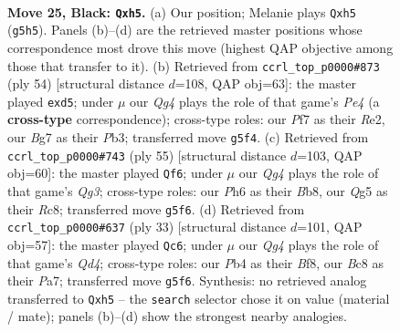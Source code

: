 \documentclass[11pt]{article}
\begin{document}
\clearpage

\begin{figure}[p]\centering
\begin{subfigure}{0.46\textwidth}\centering
\resizebox{\linewidth}{!}{%
\newchessgame
\chessboard[
  setfen={nrbr2k1/5pb1/p6p/2p1p1qP/1p2P2n/3P4/PPQ2PB1/RNB1NRK1 b - - 0 25},
  showmover=false,
  pgfstyle=straightmove, color=movearrow, markmove={g5-h5}
]}
\caption{}
\end{subfigure}\hfill
\begin{subfigure}{0.46\textwidth}\centering
\resizebox{\linewidth}{!}{%
\newchessgame
\chessboard[
  setfen={2r1rbk1/1q1n1ppb/1p5p/p1pp4/P3P2P/1PQN1BP1/1B2RP2/3R2K1 w - - 0 28},
  showmover=false,
  pgfstyle=straightmove, color=movearrow, markmove={e4-d5}
]}
\caption{}
\end{subfigure}
\\[4pt]
\begin{subfigure}{0.46\textwidth}\centering
\resizebox{\linewidth}{!}{%
\newchessgame
\chessboard[
  setfen={1br1brk1/pp4p1/1n2p1qp/4p3/4P1PP/P1NR1NBK/1PR1QP2/8 b - - 4 28},
  showmover=false,
  pgfstyle=straightmove, color=movearrow, markmove={g6-f6}
]}
\caption{}
\end{subfigure}\hfill
\begin{subfigure}{0.46\textwidth}\centering
\resizebox{\linewidth}{!}{%
\newchessgame
\chessboard[
  setfen={r3kb1r/pb1n1p2/4p2p/1p1q2p1/3P4/3QN2N/PPP2PPP/R1B2RK1 b kq - 5 17},
  showmover=false,
  pgfstyle=straightmove, color=movearrow, markmove={d5-c6}
]}
\caption{}
\end{subfigure}
\caption{\textbf{Move 25, Black: \texttt{Qxh5}.} (a) Our position; Melanie plays \texttt{Qxh5} (\texttt{g5h5}). Panels (b)--(d) are the retrieved master positions whose correspondence most drove this move (highest QAP objective among those that transfer to it). (b) Retrieved from \texttt{ccrl\_top\_p0000\#873} (ply 54) [structural distance $d$=108, QAP obj=63]: the master played \texttt{exd5}; under $\mu$ our \emph{Qg4} plays the role of that game's \emph{Pe4} (a \textbf{cross-type} correspondence); cross-type roles: our \emph{P}f7 as their \emph{R}e2, our \emph{B}g7 as their \emph{P}b3; transferred move \texttt{g5f4}. (c) Retrieved from \texttt{ccrl\_top\_p0000\#743} (ply 55) [structural distance $d$=103, QAP obj=60]: the master played \texttt{Qf6}; under $\mu$ our \emph{Qg4} plays the role of that game's \emph{Qg3}; cross-type roles: our \emph{P}h6 as their \emph{B}b8, our \emph{Q}g5 as their \emph{R}c8; transferred move \texttt{g5f6}. (d) Retrieved from \texttt{ccrl\_top\_p0000\#637} (ply 33) [structural distance $d$=101, QAP obj=57]: the master played \texttt{Qc6}; under $\mu$ our \emph{Qg4} plays the role of that game's \emph{Qd4}; cross-type roles: our \emph{P}b4 as their \emph{B}f8, our \emph{B}c8 as their \emph{P}a7; transferred move \texttt{g5f6}. Synthesis: no retrieved analog transferred to \texttt{Qxh5} -- the \texttt{search} selector chose it on value (material / mate); panels (b)--(d) show the strongest nearby analogies.}
\label{fig:thought-m49}
\end{figure}
\end{document}
